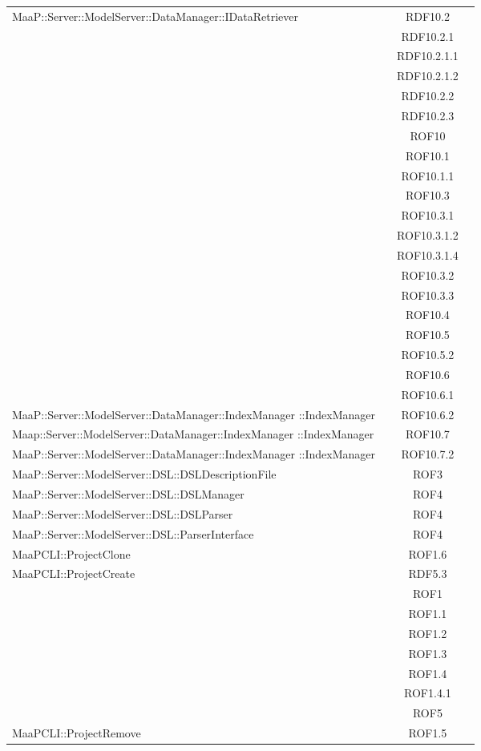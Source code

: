 \begin{center}
\begin{longtable}{|p{0.8\linewidth}|c|}
\midrule
MaaP::Server::ModelServer::DataManager::IDataRetriever
& RDF10.2\\
& RDF10.2.1\\
& RDF10.2.1.1\\
& RDF10.2.1.2\\
& RDF10.2.2\\
& RDF10.2.3\\
& ROF10\\
& ROF10.1\\
& ROF10.1.1\\
& ROF10.3\\
& ROF10.3.1\\
& ROF10.3.1.2\\
& ROF10.3.1.4\\
& ROF10.3.2\\
& ROF10.3.3\\
& ROF10.4\\
& ROF10.5\\
& ROF10.5.2\\
& ROF10.6\\
& ROF10.6.1\\

\midrule
MaaP::Server::ModelServer::DataManager::IndexManager ::IndexManager
& ROF10.6.2\\

\midrule
Maap::Server::ModelServer::DataManager::IndexManager ::IndexManager
& ROF10.7\\

\midrule
MaaP::Server::ModelServer::DataManager::IndexManager ::IndexManager
& ROF10.7.2\\

\midrule
MaaP::Server::ModelServer::DSL::DSLDescriptionFile
& ROF3\\

\midrule
MaaP::Server::ModelServer::DSL::DSLManager
& ROF4\\

\midrule
MaaP::Server::ModelServer::DSL::DSLParser
& ROF4\\

\midrule
MaaP::Server::ModelServer::DSL::ParserInterface
& ROF4\\

\midrule
MaaPCLI::ProjectClone
& ROF1.6\\

\midrule
MaaPCLI::ProjectCreate
& RDF5.3\\
& ROF1\\
& ROF1.1\\
& ROF1.2\\
& ROF1.3\\
& ROF1.4\\
& ROF1.4.1\\
& ROF5\\

\midrule
MaaPCLI::ProjectRemove
& ROF1.5\\

\end{longtable}
\end{center}

